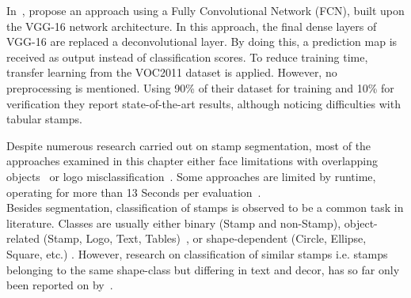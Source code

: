 \begin{description}
\begin{enumerate*}[label={\alph*)},font={\color{red!50!black}\bfseries}]
        In~\cite{Younas.09.11.201715.11.2017},
        \citeauthor*{Younas.09.11.201715.11.2017} propose an approach using a
        Fully Convolutional Network (FCN), built upon the VGG-16 network
        architecture. In this approach, the final \glspl{dense layer} of VGG-16 
        are replaced a \gls{deconvolutional layer}. By doing this, a prediction 
        map is received as output instead of classification scores. To reduce 
        training time, transfer learning from the VOC2011 dataset is applied. 
        However, no preprocessing is mentioned. Using 90\% of their dataset for 
        training and 10\% for verification they report state-of-the-art results,
        although noticing difficulties with tabular stamps.
    \end{enumerate*}
\end{description}

Despite numerous research carried out on stamp segmentation, most of the 
approaches examined in this chapter either face limitations with overlapping 
objects~\cite{Nandedkar.23.08.201526.08.2015, Nandedkar.16.12.201519.12.2015, 
Forczmanski.2016, Ahmed.25.08.201328.08.2013, Dey.16.12.201519.12.2015, 
Forczmanski.2015, Forczmanski.2016} or logo misclassification~\cite
{Ahmed.25.08.201328.08.2013, Dey.16.12.201519.12.2015, 
Micenkova.18.09.201121.09.2011}. Some approaches are limited by runtime, 
operating for more than 13 Seconds per evaluation~\cite{Ahmed.2016, 
Nandedkar.23.08.201526.08.2015}.\\
Besides segmentation, classification of stamps is observed to be a common task 
in literature. Classes are usually either binary (Stamp and non-Stamp), 
object-related (Stamp, Logo, Text, Tables)~\cite{Forczmanski.2016,
Nandedkar.23.08.201526.08.2015, Nandedkar.16.12.201519.12.2015, 
Dey.16.12.201519.12.2015}, or shape-dependent (Circle, Ellipse, Square, etc.)
\cite{Forczmanski.2015}. However, research on classification of similar stamps 
i.e. stamps belonging to the same shape-class but differing in text and decor, 
has so far only been reported on by~\cite{Petej.07.07.201310.07.2013}.